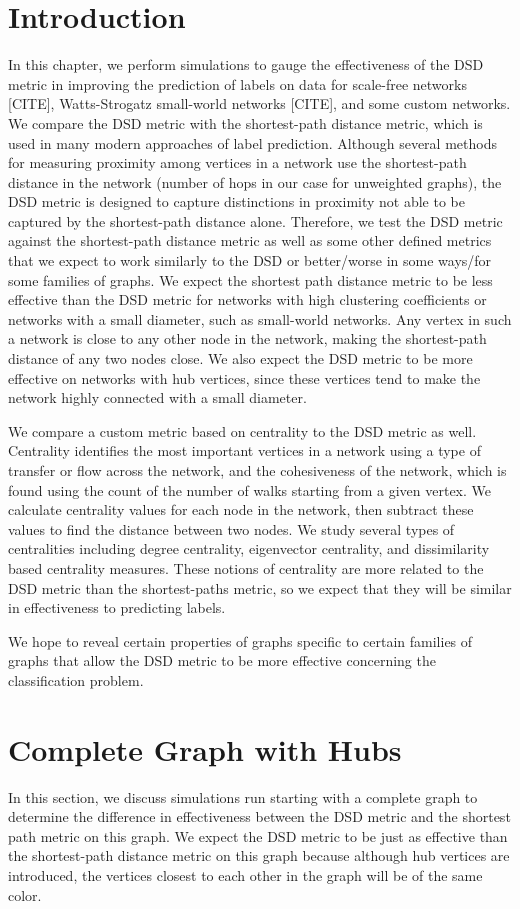 \section{Introduction}
In this chapter, we perform simulations to gauge the effectiveness of the DSD metric in improving the prediction of labels on data for scale-free networks [CITE], Watts-Strogatz small-world networks [CITE], and some custom networks. We compare the DSD metric with the shortest-path distance metric, which is used in many modern approaches of label prediction. Although several methods for measuring proximity among vertices in a network use the shortest-path distance in the network (number of hops in our case for unweighted graphs), the DSD metric is designed to capture distinctions in proximity not able to be captured by the shortest-path distance alone. Therefore, we test the DSD metric against the shortest-path distance metric as well as some other defined metrics that we expect to work similarly to the DSD or better/worse in some ways/for some families of graphs. We expect the shortest path distance metric to be less effective than the DSD metric for networks with high clustering coefficients or networks with a small diameter, such as small-world networks. Any vertex in such a network is close to any other node in the network, making the shortest-path distance of any two nodes close. We also expect the DSD metric to be more effective on networks with hub vertices, since these vertices tend to make the network highly connected with a small diameter.

We compare a custom metric based on centrality to the DSD metric as well. Centrality identifies the most important vertices in a network using a type of transfer or flow across the network, and the cohesiveness of the network, which is found using the count of the number of walks starting from a given vertex. We calculate centrality values for each node in the network, then subtract these values to find the distance between two nodes. We study several types of centralities including degree centrality, eigenvector centrality, and dissimilarity based centrality measures. These notions of centrality are more related to the DSD metric than the shortest-paths metric, so we expect that they will be similar in effectiveness to predicting labels.


We hope to reveal certain properties of graphs specific to certain families of graphs that allow the DSD metric to be more effective concerning the classification problem.

\section{Complete Graph with Hubs}
In this section, we discuss simulations run starting with a complete graph to determine the difference in effectiveness between the DSD metric and the shortest path metric on this graph. We expect the DSD metric to be just as effective than the shortest-path distance metric on this graph because although hub vertices are introduced, the vertices closest to each other in the graph will be of the same color.

